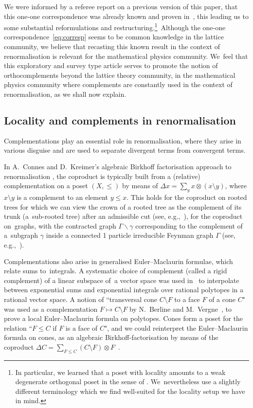 \documentclass[10pt,a4paper]{amsart}
\numberwithin{equation}{section}
\begin{document}
We were informed by a referee report on a previous version of this paper, that this one-one correspondence was already known and proven in~\cite{CM}, this leading us to some substantial reformulations and restructuring.\footnote{In particular, we learned that a poset with locality amounts to a weak degenerate orthogonal poset in the sense of \cite[Definition 2.1]{CM}. We~nevertheless use a slightly different terminology which we find well-suited for the locality setup we have in mind.}\ Although the one-one correspondence~\eqref{eq:corresp} seems to be common knowledge in the lattice community, we believe that recasting this known result in the context of renormalisation is relevant for the mathematical physics community. We~feel that this explo\-ratory and survey type article serves to promote the notion of orthocomplements beyond the lattice theory community, in the mathematical physics community where complements are constantly used in the context of renormalisation, as we shall now explain.


\subsection{ Locality and complements in renormalisation}

Complementations play an essential role in renormalisation, where they arise in various disguise and are used to separate divergent terms from convergent terms.

{\samepage
In A.~Connes and D.~Kreimer's algebraic Birkhoff factorisation approach to renormalisation
\cite{CK,M}, the coproduct is typically built from a (relative) complementation on a poset $(X, \leq)$ by means of
$\Delta x=\sum_{y} x \otimes (x\setminus y)$, where $ x\setminus y$ is a complement to an element $y\leq x$. This holds for the coproduct on rooted trees for which we can view the crown of
a rooted tree as the complement of its trunk (a~sub-rooted tree) after an admissible cut (see, e.g.,~\cite{F1,F2}), for the coproduct on~graphs, with the contracted graph $\Gamma\backslash \gamma$ corresponding to
the complement of a~subgraph $\gamma$ inside a connected 1 particle irreducible Feynman graph $\Gamma$ (see, e.g.,~\cite{M}).

}

Complementations also arise in generalised Euler--Maclaurin formulae, which relate
sums to~integrals. A systematic choice of complement (called a rigid complement) of a linear subspace of~a vector space was used in~\cite{GP} to interpolate between exponential sums and
exponential integrals over rational polytopes in a rational vector space. A notion of ``transversal cone $ C\setminus F$ to a face $F$ of a cone $C$" was used as a complementation $F\mapsto C\setminus F$ by N.~Berline and M.~Vergne~\cite{BV}, to prove a local Euler--Maclaurin formula on polytopes. Cones form a poset for the relation ``$F\leq C$ if $F$ is a face of $C$", and we could reinterpret the Euler--Maclaurin formula on cones, as an algebraic Birkhoff-factorisation by means of the coproduct $\Delta C=\sum_{F\leq C} (C\setminus F)\otimes F$~\cite{GPZ1}.
\end{document}
